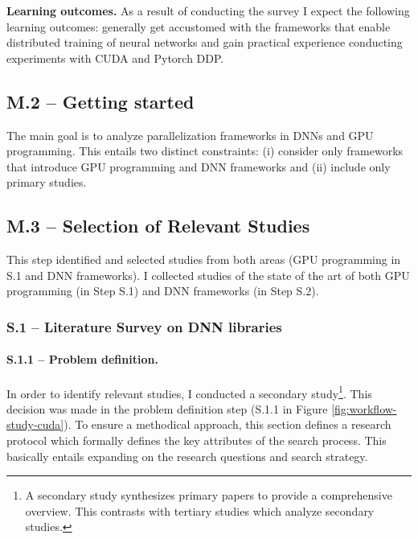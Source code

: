 \textbf{Learning outcomes.}
As a result of conducting the survey I expect the following learning outcomes: generally get accustomed
with the frameworks that enable distributed training of neural networks and gain practical experience
conducting experiments with CUDA and Pytorch DDP.

\subsection{M.2 -- Getting started}
\label{sec:research_questions}
The main goal is to analyze parallelization frameworks in DNNs and GPU programming. This entails two distinct
constraints: (i) consider only frameworks that introduce GPU programming and DNN frameworks and (ii) include
only primary studies.

\subsection{M.3 -- Selection of Relevant Studies}
This step identified and selected studies from both areas (GPU programming in S.1 and DNN
frameworks). I collected studies of the state of the art of both GPU programming (in Step S.1) and
DNN frameworks (in Step S.2).

\subsubsection{S.1 -- Literature Survey on DNN libraries}
\paragraph{S.1.1 -- Problem definition.}
In order to identify relevant studies, I conducted a secondary study\footnote{A secondary study
	synthesizes primary papers to provide a comprehensive overview. This contrasts with tertiary
	studies which analyze secondary studies.}. This decision was made in the problem definition step
(S.1.1 in Figure \ref{fig:workflow-study-cuda}). To ensure a methodical approach, this section
defines a research protocol which formally defines the key attributes of the search process. This
basically entails expanding on the research questions and search strategy.

